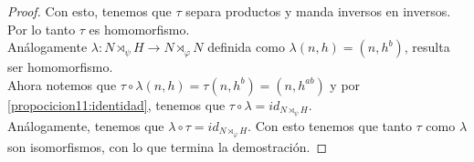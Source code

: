 \begin{proof}
    Con esto, tenemos que $\tau$ separa productos y manda inversos en inversos. Por lo tanto $\tau$ es
    homomorfismo. \\
    
    Análogamente $\lambda : N \rtimes_\psi H \rightarrow N \rtimes_\varphi N$
    definida como $\lambda(n,h) = (n, h^b)$, resulta ser homomorfismo.\\
        
    Ahora notemos que $\tau \circ \lambda(n,h) = \tau(n, h^b) = (n, h^{ab})$ y por 
    \eqref{propocicion11:identidad}, tenemos que $\tau \circ \lambda = id_{N \rtimes_\psi H}$.\\
    
    Análogamente, tenemos que $\lambda \circ \tau = id_{N \rtimes_\varphi H}$. Con esto tenemos que
    tanto $\tau$ como $\lambda$ son isomorfismos, con lo que termina la demostración. 
\end{proof}